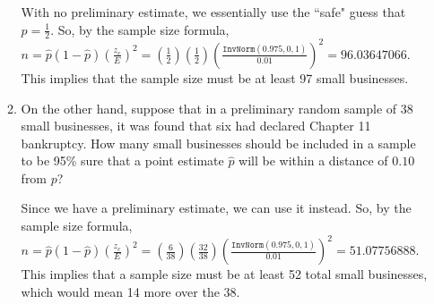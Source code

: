 \begin{enumerate}
\begin{enumerate}
	{\answer With no preliminary estimate, we essentially use the ``safe" guess that $p= \frac{1}{2}$.  
	So, by the sample size formula, $n = \hat{p}(1-\hat{p})\left(\frac{z_c}{E}\right)^2 = \left(\frac{1}{2}\right)\left(\frac{1}{2}\right)\left(\frac{\texttt{InvNorm}(0.975,0,1)}{0.01}\right)^2 = 96.03647066$.  
	This implies that the sample size must be at least 97 small businesses.
	} 
	
	\item On the other hand, suppose that in a preliminary random sample of 38 small businesses, it was found that six had declared Chapter 11 bankruptcy. How many small businesses should be included in a sample to be 95\% sure that a point estimate $\hat{p}$ will be within a distance of $0.10$ from $p$? 
	
	{\answer Since we have a preliminary estimate, we can use it instead.  
	So, by the sample size formula, $n = \hat{p}(1-\hat{p})\left(\frac{z_c}{E}\right)^2 = \left(\frac{6}{38}\right)\left(\frac{32}{38}\right)\left(\frac{\texttt{InvNorm}(0.975,0,1)}{0.01}\right)^2 = 51.07756888$.  
	This implies that a sample size must be at least 52 total small businesses, which would mean 14 more over the 38.
	} 
	\end{enumerate}

\end{enumerate}

